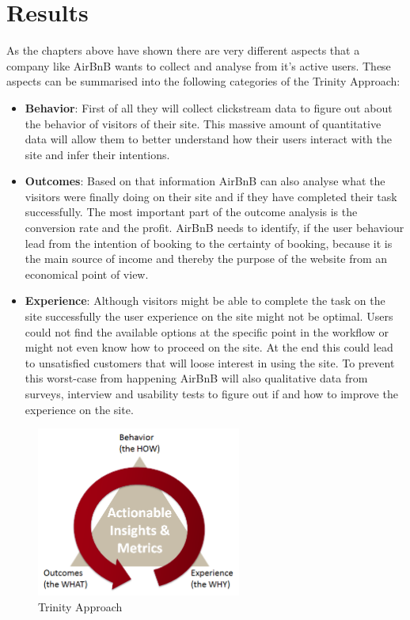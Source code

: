 \section{Results} %
\label{sec:results}

As the chapters above have shown there are very different aspects that a company like AirBnB wants to collect and analyse from it's active users. These aspects can be summarised into the following categories of the Trinity Approach:

\begin{itemize}
    \item \textbf{Behavior}: First of all they will collect clickstream data to figure out about the behavior of visitors of their site. This massive amount of quantitative data will allow them to better understand how their users interact with the site and infer their intentions.
    \item \textbf{Outcomes}: Based on that information AirBnB can also analyse what the visitors were finally doing on their site and if they have completed their task successfully. The most important part of the outcome analysis is the conversion rate and the profit. AirBnB needs to identify, if the user behaviour lead from the intention of booking to the certainty of booking, because it is the main source of income and thereby the purpose of the website from an economical point of view.
    \item \textbf{Experience}: Although visitors might be able to complete the task on the site successfully the user experience on the site might not be optimal. Users could not find the available options at the specific point in the workflow or might not even know how to proceed on the site. At the end this could lead to unsatisfied customers that will loose interest in using the site. To prevent this worst-case from happening AirBnB will also qualitative data from surveys, interview and usability tests to figure out if and how to improve the experience on the site.
\end{itemize}

\begin{figure}[H]
\centering
\includegraphics[width=0.6\textwidth]{assets/trinity_strategy.png}
\caption{Trinity Approach}
\label{fig:trinity}
\end{figure}

